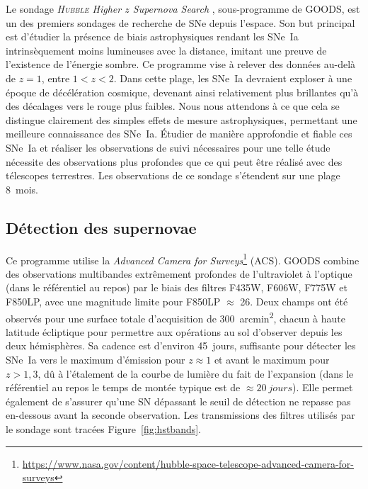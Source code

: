 \documentclass[../main/main.tex]{subfiles}
\begin{document}
Le sondage \textit{\textsc{Hubble} Higher $z$ Supernova Search}
\citep[HHZSS,][]{strolger2004}, sous-programme de GOODS, est un des premiers
sondages de recherche de SNe depuis l'espace. Son but principal est d'étudier la
présence de biais astrophysiques rendant les SNe~Ia intrinsèquement moins
lumineuses avec la distance, imitant une preuve de l'existence de l'énergie
sombre. Ce programme vise à relever des données au-delà de $z = 1$, entre $1 < z
< 2$. Dans cette plage, les SNe~Ia devraient exploser à une époque de
décélération cosmique, devenant ainsi relativement plus brillantes qu'à des
décalages vers le rouge plus faibles. Nous nous attendons à ce que cela se
distingue clairement des simples effets de mesure astrophysiques, permettant une
meilleure connaissance des SNe~Ia. Étudier de manière approfondie et fiable ces
SNe~Ia et réaliser les observations de suivi nécessaires pour une telle étude
nécessite des observations plus profondes que ce qui peut être réalisé avec des
télescopes terrestres. Les observations de ce sondage s'étendent sur une plage
\SI{8}{mois}.

\subsection{Détection des supernovae}\label{ssec:hstdetec}

Ce programme utilise la \textit{Advanced Camera for
Surveys}\footnote{\href{https://www.nasa.gov/content/hubble-space-telescope-advanced-camera-for-surveys}
{https://www.nasa.gov/content/hubble-space-telescope-advanced-camera-for-surveys}}
(ACS). GOODS combine des observations multibandes extrêmement profondes de
l'ultraviolet à l'optique (dans le référentiel au repos) par le biais des
filtres F435W, F606W, F775W et F850LP, avec une magnitude limite pour F850LP
$\approx$ 26. Deux champs ont été observés pour une surface totale d'acquisition
de \SI{300}{arcmin^2}, chacun à haute latitude écliptique pour permettre aux
opérations au sol d'observer depuis les deux hémisphères. Sa cadence est
d'environ \SI{45}{jours}, suffisante pour détecter les SNe~Ia vers le maximum
d'émission pour $z \approx 1$ et avant le maximum pour $z > 1,3$, dû à
l'étalement de la courbe de lumière du fait de l'expansion (dans le référentiel
au repos le temps de montée typique est de $\approx \SI{20}{jours}$). Elle
permet également de s'assurer qu'une SN dépassant le seuil de détection ne
repasse pas en-dessous avant la seconde observation. Les transmissions des
filtres utilisés par le sondage sont tracées Figure~\ref{fig:hstbands}.
\end{document}
